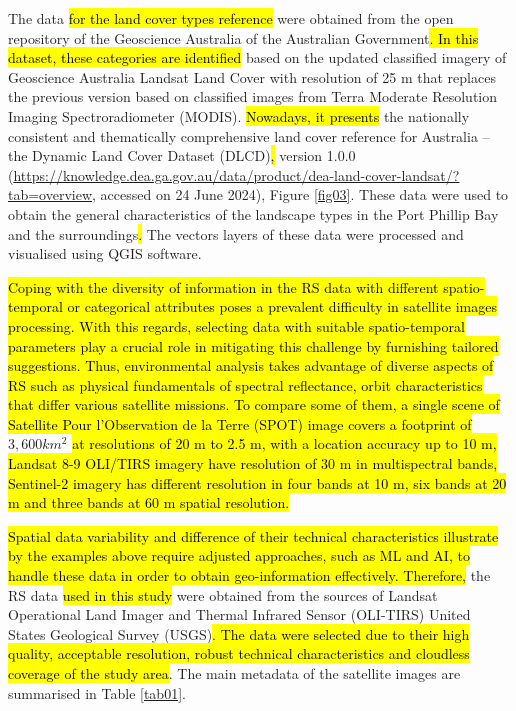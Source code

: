 \documentclass[jmse,article,submit,pdftex,moreauthors]{Definitions/mdpi}
\begin{document}
The\hl{ }data\hl{ for the land cover types reference }were obtained from the open repository of the Geoscience Australia of the Australian Government\hl{. In this dataset, these categories are identified }based on the updated classified imagery of Geoscience Australia Landsat Land Cover with resolution of 25\hl{ }m that replaces the previous version based on classified images from Terra Moderate Resolution Imaging Spectroradiometer (MODIS). \hl{Nowadays, it presents }the nationally consistent and thematically comprehensive land cover reference for Australia -- the Dynamic Land Cover Dataset (DLCD)\hl{, }version 1.0.0 (\href{https://knowledge.dea.ga.gov.au/data/product/dea-land-cover-landsat/?tab=overview}{https://knowledge.dea.ga.gov.au/data/product/dea-land-cover-landsat/?tab=overview}, accessed on 24 June 2024), Figure \ref{fig03}. These data were used to obtain the general characteristics of the landscape types in the Port Phillip Bay and the surroundings\hl{. }The vectors layers of these data were processed and visualised using QGIS software.\hl{ }

\hl{Coping with the diversity of information in the RS data with different spatio-temporal or categorical attributes poses a prevalent difficulty in satellite images processing. With this regards, selecting data with suitable spatio-temporal parameters play a crucial role in mitigating this challenge by furnishing tailored suggestions. Thus, environmental analysis takes advantage of diverse aspects of RS such as physical fundamentals of spectral reflectance, orbit characteristics that differ various satellite missions. To compare some of them, a single scene of Satellite Pour l'Observation de la Terre (SPOT) image covers a footprint of} $3,600 km^2$ \hl{at resolutions of 20 m to 2.5 m, with a location accuracy up to 10 m, Landsat 8-9 OLI/TIRS imagery have resolution of 30 m in multispectral bands, Sentinel-2 imagery has different resolution in four bands at 10 m, six bands at 20 m and three bands at 60 m spatial resolution. }

\hl{Spatial data variability and difference of their technical characteristics illustrate by the examples above require adjusted approaches, such as ML and AI, to handle these data in order to obtain geo-information effectively. Therefore, }the RS data \hl{used in this study }were obtained from the sources of Landsat Operational Land Imager and Thermal Infrared Sensor (OLI-TIRS) United States Geological Survey (USGS)\hl{. The data were selected due to their high quality, acceptable resolution, robust technical characteristics and cloudless coverage of the study area}. The main metadata of the satellite images are summarised in Table \ref{tab01}. 
\end{document}
